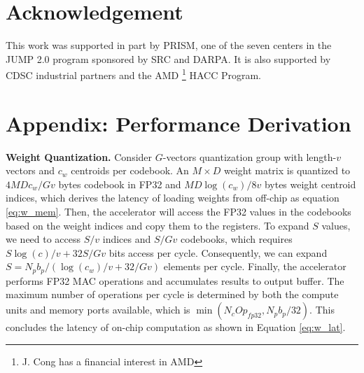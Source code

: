 \documentclass[conference]{IEEEtran}
\begin{document}
\section*{Acknowledgement}

This work was supported in part by PRISM, one of the seven centers in the JUMP 2.0 program sponsored by SRC and DARPA. It is also supported by CDSC industrial partners and the AMD \footnote{J. Cong has a financial interest in AMD} HACC Program.

\section{Appendix: Performance Derivation} \label{sec:derivation}

\noindent \textbf{Weight Quantization.} Consider $G$-vectors quantization group with length-$v$ vectors and $c_w$ centroids per codebook. An $M\times D$ weight matrix is quantized to $4MDc_w/Gv$ bytes codebook in FP32 and $MD\log(c_w)/8v$ bytes weight centroid indices, which derives the latency of loading weights from off-chip as equation \ref{eq:w_mem}. Then, the accelerator will access the FP32 values in the codebooks based on the weight indices and copy them to the registers. To expand $S$ values, we need to access $S/v$ indices and $S / Gv$ codebooks, which requires $S\log(c)/v + 32S/Gv$ bits access per cycle. Consequently, we can expand $S = N_{p}b_{p}/(\log(c_w)/v+32/Gv)$ elements per cycle. Finally, the accelerator performs FP32 MAC operations and accumulates results to output buffer. The maximum number of operations per cycle is determined by both the compute units and memory ports available, which is $\min(N_{c}Op_{fp32}, N_{p}b_{p}/32)$. This concludes the latency of on-chip computation as shown in Equation \ref{eq:w_lat}.
\end{document}
